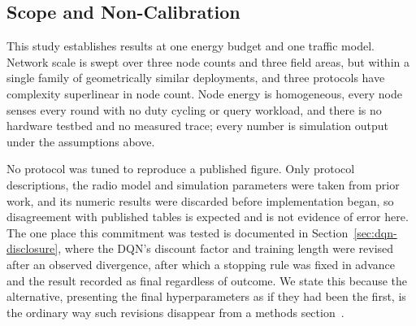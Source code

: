 \subsection{Scope and Non-Calibration}

This study establishes results at one energy budget and one traffic model.
Network scale is swept over three node counts and three field areas, but within
a single family of geometrically similar deployments, and three protocols have
complexity superlinear in node count. Node energy is homogeneous, every node
senses every round with no duty cycling or query workload, and there is no
hardware testbed and no measured trace; every number is simulation output under
the assumptions above.

No protocol was tuned to reproduce a published figure. Only protocol
descriptions, the radio model and simulation parameters were taken from prior
work, and its numeric results were discarded before implementation began, so
disagreement with published tables is expected and is not evidence of error
here. The one place this commitment was tested is documented in
Section~\ref{sec:dqn-disclosure}, where the DQN's discount factor and training
length were revised after an observed divergence, after which a stopping rule
was fixed in advance and the result recorded as final regardless of outcome. We
state this because the alternative, presenting the final hyperparameters as if
they had been the first, is the ordinary way such revisions disappear from a
methods section~\cite{henderson2018matters,pineau2021reproducibility}.
